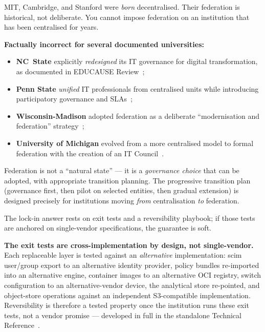 \bigskip

\begin{clarificationbox}
MIT, Cambridge, and Stanford were \emph{born} decentralised. Their federation is historical, not deliberate. You cannot impose federation on an institution that has been centralised for years.
\end{clarificationbox}

\begin{answerbox}[Answer to Q5.3]
\textbf{Factually incorrect for several documented universities:}
\begin{itemize}[nosep]
    \item \textbf{NC~State} explicitly \emph{redesigned} its IT governance for digital transformation, as documented in EDUCAUSE Review~\cite{ncsu-governance};
    \item \textbf{Penn State} \emph{unified} IT professionals from centralised units while introducing participatory governance and SLAs~\cite{pennstate-it};
    \item \textbf{Wisconsin-Madison} adopted federation as a deliberate ``modernisation and federation'' strategy~\cite{uw-madison};
    \item \textbf{University of Michigan} evolved from a more centralised model to formal federation with the creation of an IT Council~\cite{umich-it-council}.
\end{itemize}

\noindent Federation is not a ``natural state'' --- it is a \emph{governance choice} that can be adopted, with appropriate transition planning. The progressive transition plan (governance first, then pilot on selected entities, then gradual extension) is designed precisely for institutions moving \emph{from} centralisation \emph{to} federation.
\end{answerbox}

\bigskip

\begin{questionbox}
The lock-in answer rests on exit tests and a reversibility playbook; if those tests are anchored on single-vendor specifications, the guarantee is soft.
\end{questionbox}

\begin{answerbox}[Answer to Q5.4]
\textbf{The exit tests are cross-implementation by design, not single-vendor.} Each replaceable layer is tested against an \emph{alternative} implementation: \gls{scim} user/group export to an alternative identity provider, policy bundles re-imported into an alternative engine, container images to an alternative OCI registry, switch configuration to an alternative-vendor device, the analytical store re-pointed, and object-store operations against an independent S3-compatible implementation. Reversibility is therefore a tested property once the institution runs these exit tests, not a vendor promise --- developed in full in the standalone Technical Reference~\cite{ng-tech-ref-2026}.
\end{answerbox}


